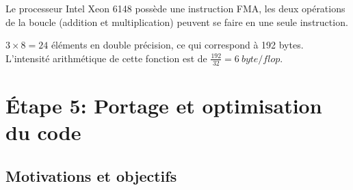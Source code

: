 Le processeur Intel Xeon 6148 possède une instruction FMA, les deux opérations de la boucle (addition et multiplication) peuvent se faire en une seule instruction.

$3 \times 8 = 24$ éléments en double précision, ce qui correspond à 192 bytes. L'intensité arithmétique de cette fonction est de $ \frac{192}{32} = 6\ byte/flop$. 

\section{Étape 5: Portage et optimisation du code}


\subsection{Motivations et objectifs}

